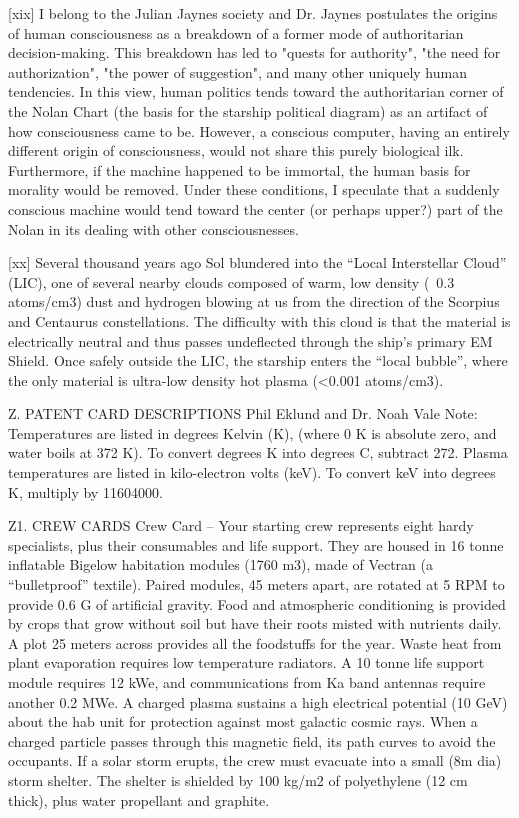 \documentclass[a4paper]{book}
\begin{document}
[xix] I belong to the Julian Jaynes society and Dr. Jaynes postulates the origins of human consciousness as a breakdown of a former mode of authoritarian decision-making. This breakdown has led to "quests for authority", "the need for authorization", "the power of suggestion", and many other uniquely human tendencies. In this view, human politics tends toward the authoritarian corner of the Nolan Chart (the basis for the starship political diagram) as an artifact of how consciousness came to be. However, a conscious computer, having an entirely different origin of consciousness, would not share this purely biological ilk. Furthermore, if the machine happened to be immortal, the human basis for morality would be removed. Under these conditions, I speculate that a suddenly conscious machine would tend toward the center (or perhaps upper?) part of the Nolan in its dealing with other consciousnesses.
 
[xx] Several thousand years ago Sol blundered into the “Local Interstellar Cloud” (LIC), one of several nearby clouds composed of warm, low density (~0.3 atoms/cm3) dust and hydrogen blowing at us from the direction of the Scorpius and Centaurus constellations. The difficulty with this cloud is that the material is electrically neutral and thus passes undeflected through the ship’s primary EM Shield. Once safely outside the LIC, the starship enters the “local bubble”, where the only material is ultra-low density hot plasma (<0.001 atoms/cm3).
 
Z. PATENT CARD DESCRIPTIONS
Phil Eklund and Dr. Noah Vale
Note: Temperatures are listed in degrees Kelvin (K), (where 0 K is absolute zero, and water boils at 372 K).  To convert degrees K into degrees C, subtract 272.  Plasma temperatures are listed in kilo-electron volts (keV). To convert keV into degrees K, multiply by 11604000.
 
Z1. CREW CARDS
Crew Card – Your starting crew represents eight hardy specialists, plus their consumables and life support. They are housed in 16 tonne inflatable Bigelow habitation modules (1760 m3), made of Vectran (a “bulletproof” textile). Paired modules, 45 meters apart, are rotated at 5 RPM to provide 0.6 G of artificial gravity.  Food and atmospheric conditioning is provided by crops that grow without soil but have their roots misted with nutrients daily.  A plot 25 meters across provides all the foodstuffs for the year. Waste heat from plant evaporation requires low temperature radiators. A 10 tonne life support module requires 12 kWe, and communications from Ka band antennas require another 0.2 MWe.  A charged plasma sustains a high electrical potential (10 GeV) about the hab unit for protection against most galactic cosmic rays. When a charged particle passes through this magnetic field, its path curves to avoid the occupants. If a solar storm erupts, the crew must evacuate into a small (8m dia)  storm shelter.  The shelter is shielded by 100 kg/m2 of polyethylene (12 cm thick), plus water propellant and graphite.
 
\end{document}
